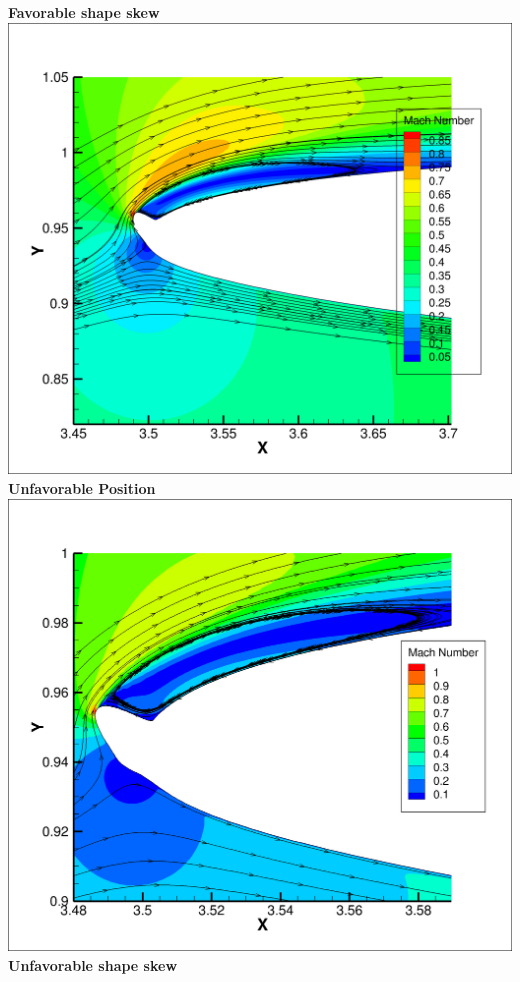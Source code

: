 \documentclass[9pt]{beamer}
\begin{document}
\begin{frame}
\begin{columns}[c]
    {\bf Favorable shape skew}
    \centering
    \includegraphics[width=1\textwidth]{BadHorn.png} \\
    {\bf Unfavorable Position}
    \includegraphics[width=1\textwidth]{BadHornPOD.png} \\
    {\bf Unfavorable shape skew}
\end{columns}
\end{frame}
\end{document}
